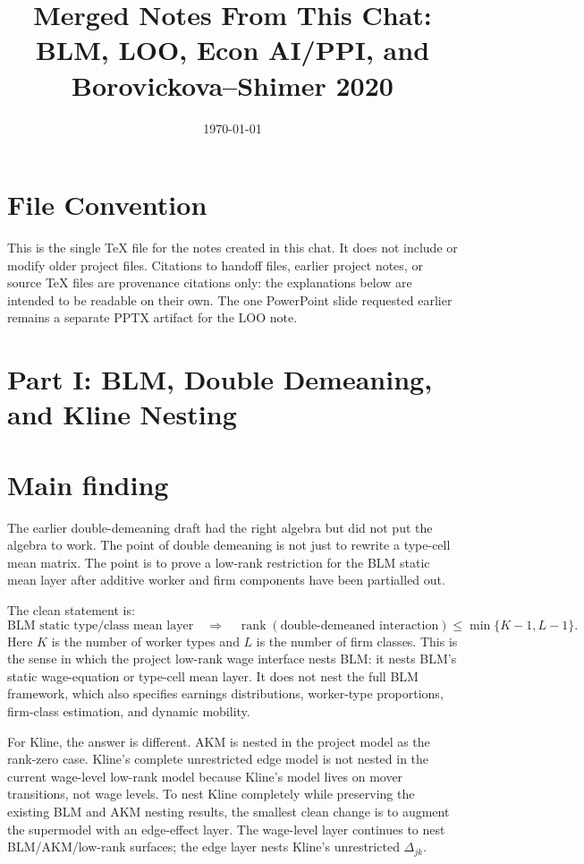 \documentclass[11pt]{article}
\title{Merged Notes From This Chat: BLM, LOO, Econ AI/PPI, and Borovickova--Shimer 2020}
\author{}
\date{\today}
\newcommand{\rank}{\operatorname{rank}}
\begin{document}
\maketitle

\section*{File Convention}

This is the single TeX file for the notes created in this chat. It does not include or modify older project files. Citations to handoff files, earlier project notes, or source \TeX{} files are provenance citations only: the explanations below are intended to be readable on their own. The one PowerPoint slide requested earlier remains a separate PPTX artifact for the LOO note.


\clearpage
\section*{Part I: BLM, Double Demeaning, and Kline Nesting}

\section*{Main finding}

The earlier double-demeaning draft had the right algebra but did not put the algebra
to work. The point of double demeaning is not just to rewrite a type-cell mean
matrix. The point is to prove a low-rank restriction for the BLM static mean
layer after additive worker and firm components have been partialled out.

The clean statement is:
\[
\text{BLM static type/class mean layer}
\quad\Longrightarrow\quad
\rank(\text{double-demeaned interaction})\leq \min\{K-1,L-1\}.
\]
Here \(K\) is the number of worker types and \(L\) is the number of firm
classes. This is the sense in which the project low-rank wage interface nests
BLM: it nests BLM's static wage-equation or type-cell mean layer. It does not
nest the full BLM framework, which also specifies earnings distributions,
worker-type proportions, firm-class estimation, and dynamic mobility.

For Kline, the answer is different. AKM is nested in the project model as the
rank-zero case. Kline's complete unrestricted edge model is not nested in the
current wage-level low-rank model because Kline's model lives on mover
transitions, not wage levels. To nest Kline completely while preserving the
existing BLM and AKM nesting results, the smallest clean change is to augment
the supermodel with an edge-effect layer. The wage-level layer continues to
nest BLM/AKM/low-rank surfaces; the edge layer nests Kline's unrestricted
\(\Delta_{jk}\).
\end{document}
